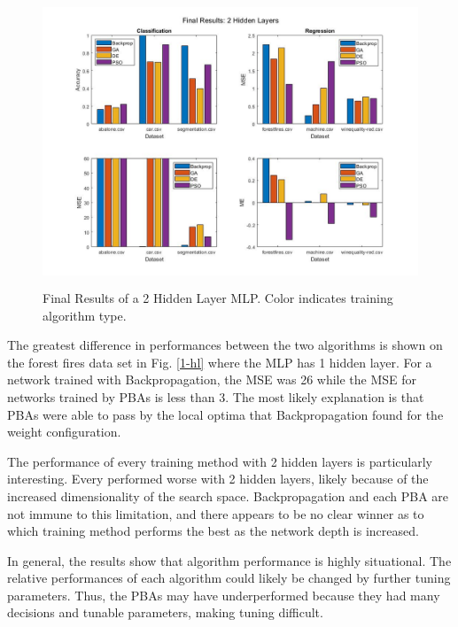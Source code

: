 \documentclass[twoside,11pt]{article}
\begin{document}
	\begin{figure}[h]
		\centering
		\includegraphics[height=3.4in]{FINAL_FIGS/2_hl.jpg}
		\caption{Final Results of a 2 Hidden Layer MLP. Color indicates training algorithm type.}
		\label{2-hl}
	\end{figure}

	The greatest difference in performances between the two algorithms is shown on the forest fires data set in Fig. \ref{1-hl} where the MLP has 1 hidden layer.
	For a network trained with Backpropagation, the MSE was 26 while the MSE for networks trained by PBAs is less than 3.
	The most likely explanation is that PBAs were able to pass by the local optima that Backpropagation found for the weight configuration.

	The performance of every training method with 2 hidden layers is particularly interesting. Every performed worse with 2 hidden layers, likely because of the increased dimensionality of the search space. Backpropagation and each PBA are not immune to this limitation, and there appears to be no clear winner as to which training method performs the best as the network depth is increased.

	In general, the results show that algorithm performance is highly situational. The relative performances of each algorithm could likely be changed by further tuning parameters. Thus, the PBAs may have underperformed because they had many decisions and tunable parameters, making tuning difficult.

	
\end{document}

